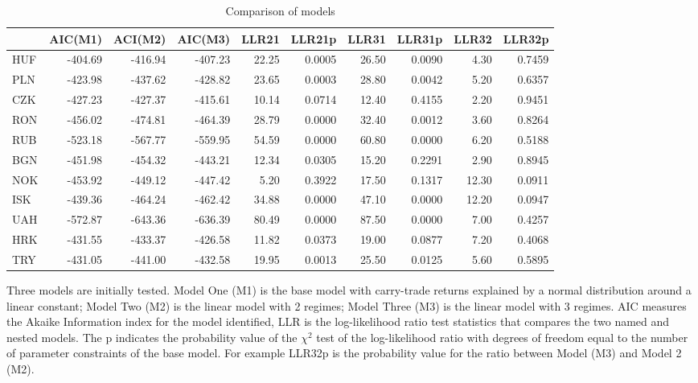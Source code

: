\documentclass[12pt, a4paper, oneside]{article}\usepackage[]{graphicx}\usepackage[]{color}
\begin{document}
\begin{landscape}
\begin{table}[ht]
\begin{threeparttable}
\centering
\begin{tabular}{l|rrrrrrrrr}
  \hline
 & AIC(M1) & ACI(M2) & AIC(M3) & LLR21 & LLR21p & LLR31 & LLR31p & LLR32 & LLR32p \\ 
  \hline
HUF & -404.69 & -416.94 & -407.23 & 22.25 & 0.0005 & 26.50 & 0.0090 & 4.30 & 0.7459 \\ 
  PLN & -423.98 & -437.62 & -428.82 & 23.65 & 0.0003 & 28.80 & 0.0042 & 5.20 & 0.6357 \\ 
  CZK & -427.23 & -427.37 & -415.61 & 10.14 & 0.0714 & 12.40 & 0.4155 & 2.20 & 0.9451 \\ 
  RON & -456.02 & -474.81 & -464.39 & 28.79 & 0.0000 & 32.40 & 0.0012 & 3.60 & 0.8264 \\ 
  RUB & -523.18 & -567.77 & -559.95 & 54.59 & 0.0000 & 60.80 & 0.0000 & 6.20 & 0.5188 \\ 
  BGN & -451.98 & -454.32 & -443.21 & 12.34 & 0.0305 & 15.20 & 0.2291 & 2.90 & 0.8945 \\ 
  NOK & -453.92 & -449.12 & -447.42 & 5.20 & 0.3922 & 17.50 & 0.1317 & 12.30 & 0.0911 \\ 
  ISK & -439.36 & -464.24 & -462.42 & 34.88 & 0.0000 & 47.10 & 0.0000 & 12.20 & 0.0947 \\ 
  UAH & -572.87 & -643.36 & -636.39 & 80.49 & 0.0000 & 87.50 & 0.0000 & 7.00 & 0.4257 \\ 
  HRK & -431.55 & -433.37 & -426.58 & 11.82 & 0.0373 & 19.00 & 0.0877 & 7.20 & 0.4068 \\ 
  TRY & -431.05 & -441.00 & -432.58 & 19.95 & 0.0013 & 25.50 & 0.0125 & 5.60 & 0.5895 \\ 
   \hline
\end{tabular}
\begin{tablenotes}
\small
\item Three models are initially tested.  Model One (M1) is the base model with carry-trade returns explained by a normal distribution around a linear constant; Model Two (M2) is the linear model with 2 regimes; Model Three (M3) is the linear model with 3 regimes.  AIC measures the Akaike Information index for the model identified, LLR is the log-likelihood ratio test statistics that compares the two named and nested models.  The p indicates the probability value of the $\chi^2$ test of the log-likelihood ratio with degrees of freedom equal to the number of parameter constraints of the base model.  For example LLR32p is the probability value for the ratio between Model (M3) and Model 2 (M2).
\end{tablenotes}
\caption{Comparison of models}
\label{tabref:comptab2}
\end{threeparttable}
\end{table} 
\end{landscape}
\end{document}
